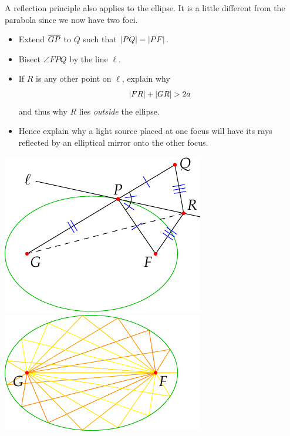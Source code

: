 \begin{exercises}{}{}
\begin{enumerate}
  \begin{minipage}[t]{0.6\linewidth}\vspace{0pt}
	\item A reflection principle also applies to the ellipse. It is a little different from the parabola since we now have two foci.
	\begin{itemize}
	  \item Extend $\overline{GP}$ to $Q$ such that $\left| PQ\right|=\left| PF\right|$.
	  \item Bisect $\angle FPQ$ by the line $\ell$.
	  \item If $R$ is any other point on $\ell$, explain why
	  \[\nm{FR}+\nm{GR}>2a\]
	  and thus why $R$ lies \emph{outside} the ellipse.
	  \item Hence explain why a light source placed at one focus will have its rays reflected by an elliptical mirror onto the other focus.
	\end{itemize}
\end{minipage}\begin{minipage}[t]{0.4\linewidth}\vspace{0pt}
\flushright\includegraphics{ellipse3}\\
\includegraphics{ellipse4}
\end{minipage}
\end{enumerate}
\end{exercises}


